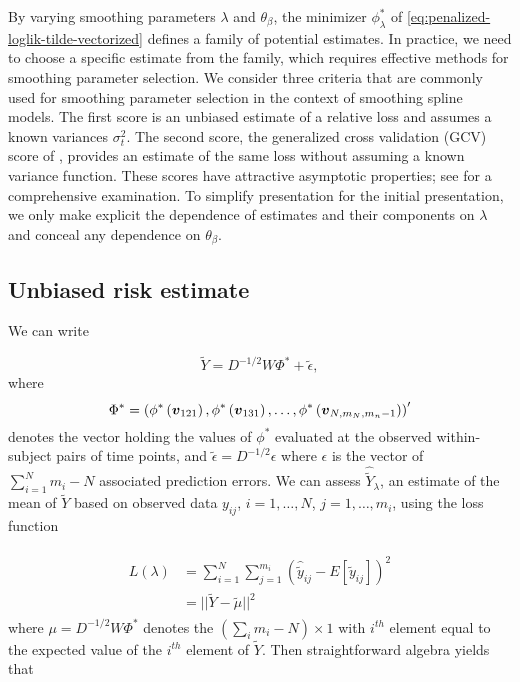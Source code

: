 \documentclass[12pt]{article}
\newcommand{\tildeY}{\tilde{Y}}
\newcommand{\tildey}{\tilde{y}}
\newcommand{\tildeepsilon}{\tilde{\epsilon}}
\newcommand{\bfv}{\mbox{\boldmath $v$}}
\theoremstyle{definition}
\begin{document}
By varying smoothing parameters $\lambda$ and $\theta_\beta$, the minimizer $\phi^*_\lambda$ of \ref{eq:penalized-loglik-tilde-vectorized} defines a family of potential estimates. In practice, we need to choose a specific estimate from the family, which requires effective methods for smoothing parameter selection. We consider three criteria that are commonly used for smoothing parameter selection in the context of smoothing spline models. The first score is an unbiased estimate of a relative loss and assumes a known variances $\sigma_t^2$. The second score, the generalized cross validation (GCV) score of \citet{craven1978smoothing}, provides an estimate of the same loss without assuming a known variance function. These scores have attractive asymptotic properties; see \citet{gu2013smoothing} for a comprehensive examination.   To simplify presentation for the initial presentation, we only make explicit the dependence of estimates and their components on $\lambda$ and conceal any dependence on $\theta_\beta$. 

\subsection{Unbiased risk estimate}

We can write

\begin{equation} 
\tildeY = D^{-1/2}W \Phi^* + \tildeepsilon,
\end{equation}
\noindent
where 
\[
\Phi^* = \left( \phi^*\left( \bfv_{121} \right), \phi^*\left( \bfv_{131} \right), \dots, \phi^*\left( \bfv_{N,m_N, m_n -1} \right) \right)'
\]
\noindent
denotes the vector holding the values of $\phi^*$ evaluated at the observed within-subject pairs of time points, and $\tildeepsilon = D^{-1/2} \epsilon$ where $\epsilon$ is the vector of $\sum_{i = 1}^Nm_i - N$ associated prediction errors.  We can assess $\hat{\tildeY}_\lambda$, an estimate of the mean of $\tildeY$ based on observed data $y_{ij}$, $i = 1,\dots, N$, $j = 1,\dots, m_i$, using the loss function

\begin{align}
\begin{split}
L\left(\lambda\right) &= \sum_{i = 1}^N \sum_{j = 1}^{m_i} \left(\hat{\tildey}_{ij} - E\left[\tildey_{ij}\right] \right)^2\\
&= \vert \vert \tildeY - \tilde{\mu} \vert \vert^2
\end{split}
\end{align}
\noindent
where $\mu = D^{-1/2}W \Phi^*$ denotes the $\left( \sum \limits_{i} m_i - N\right) \times 1$ with $i^{th}$ element equal to the expected value of the  $i^{th}$ element of $\tildeY$.  Then straightforward algebra yields that 
\end{document}
